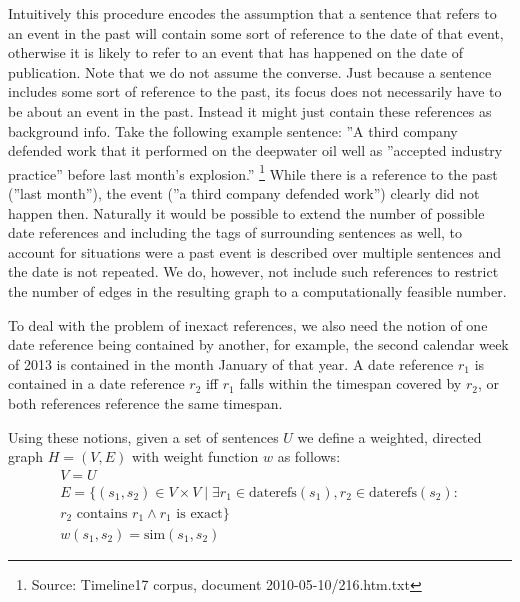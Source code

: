 \documentclass[a4paper,BCOR=10mm]{report}
\begin{document}
Intuitively this procedure encodes the assumption that a sentence that refers to an event in the past will contain some sort of reference to the date of that event, otherwise it is likely to refer to an event that has happened on the date of publication.
Note that we do not assume the converse. Just because a sentence includes some sort of reference to the past, its focus does not necessarily have to be about an event in the past. Instead it might just contain these references as background info.
Take the following example sentence: ''A third company defended work that it performed on the deepwater oil well as ''accepted industry practice'' before last month's explosion.'' \footnote{Source: Timeline17 corpus, document 2010-05-10/216.htm.txt} 
While there is a reference to the past (''last month''), the event (''a third company defended work'') clearly did not happen then.
Naturally it would be possible to extend the number of possible date references and including the tags of surrounding sentences as well, to account for situations were a past event is described over multiple sentences and the date is not repeated. We do, however, not include such references to restrict the number of edges in the resulting graph to a computationally feasible number.

To deal with the problem of inexact references, we also need the notion of one date reference being contained by another, for example, the second calendar week of 2013 is contained in the month January of that year.
A date reference $r_1$ is contained in a date reference $r_2$ iff $r_1$ falls within the timespan covered by $r_2$, or both references reference the same timespan.

Using these notions, given a set of sentences $U$ we define a weighted, directed graph $H = (V, E)$ with weight function $w$ as follows:
\begin{align*}
V = U \\
E = \{ (s_1, s_2) \in V \times V \mid \exists r_1 \in \text{daterefs}(s_1), r_2 \in \text{daterefs}(s_2) \colon \\ r_2 \text{ contains } r_1 \land r_1 \text{ is exact} \} \\ %
w(s_1, s_2) = \text{sim}(s_1, s_2)
\end{align*}
\end{document}
